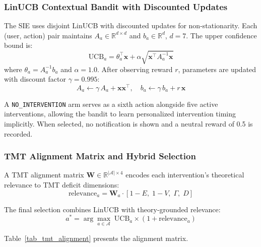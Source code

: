 \documentclass[conference]{IEEEtran}
\begin{document}
\subsubsection{LinUCB Contextual Bandit with Discounted Updates}
The SIE uses disjoint LinUCB \cite{b9} with discounted updates for non-stationarity. Each (user, action) pair maintains $A_a \in \mathbb{R}^{d \times d}$ and $b_a \in \mathbb{R}^d$, $d = 7$. The upper confidence bound is:
\begin{equation}
\text{UCB}_a = \theta_a^\top \mathbf{x} + \alpha \sqrt{\mathbf{x}^\top A_a^{-1} \mathbf{x}}
\label{eq_linucb_score}
\end{equation}
where $\theta_a = A_a^{-1} b_a$ and $\alpha = 1.0$. After observing reward $r$, parameters are updated with discount factor $\gamma = 0.995$:
\begin{equation}
A_a \leftarrow \gamma \, A_a + \mathbf{x}\mathbf{x}^\top, \quad b_a \leftarrow \gamma \, b_a + r \, \mathbf{x}
\label{eq_linucb_update}
\end{equation}

A \texttt{NO\_INTERVENTION} arm serves as a sixth action alongside five active interventions, allowing the bandit to learn personalized intervention timing implicitly. When selected, no notification is shown and a neutral reward of 0.5 is recorded.

\subsubsection{TMT Alignment Matrix and Hybrid Selection}
A TMT alignment matrix $\mathbf{W} \in \mathbb{R}^{|\mathcal{A}| \times 4}$ encodes each intervention's theoretical relevance to TMT deficit dimensions:
\begin{equation}
\text{relevance}_a = \mathbf{W}_a \cdot [1 - E,\; 1 - V,\; \Gamma,\; D]
\label{eq_relevance}
\end{equation}

The final selection combines LinUCB with theory-grounded relevance:
\begin{equation}
a^* = \arg\max_{a \in \mathcal{A}} \; \text{UCB}_a \times (1 + \text{relevance}_a)
\label{eq_hybrid_select}
\end{equation}

Table~\ref{tab_tmt_alignment} presents the alignment matrix.
\end{document}
